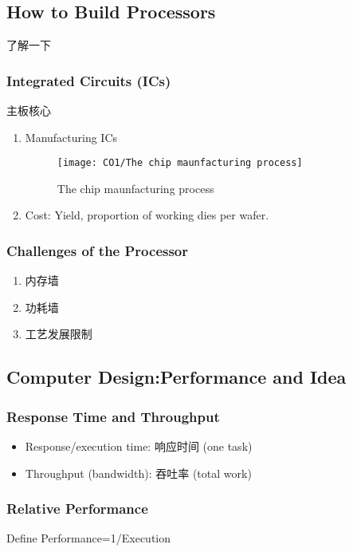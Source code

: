 \subsection{How to Build Processors}
了解一下
\subsubsection{Integrated Circuits (ICs)}
主板核心

\begin{enumerate}
    \item Manufacturing ICs
    \begin{figure}[H]
        \centering
        \texttt{[image: CO1/The chip maunfacturing process]}
        \caption{The chip maunfacturing process}
    \end{figure}
    \item Cost: Yield, proportion of working dies per wafer. 
\end{enumerate}

\subsubsection{Challenges of the Processor}
\begin{enumerate}
    \item 内存墙
    \item 功耗墙
    \item 工艺发展限制
\end{enumerate}

\subsection{Computer Design:Performance and Idea}

\subsubsection{Response Time and Throughput}
\begin{itemize}
    \item Response/execution time: 响应时间 (one task)
    \item Throughput (bandwidth): 吞吐率 (total work)
\end{itemize}

\subsubsection{Relative Performance}
Define Performance=1/Execution

